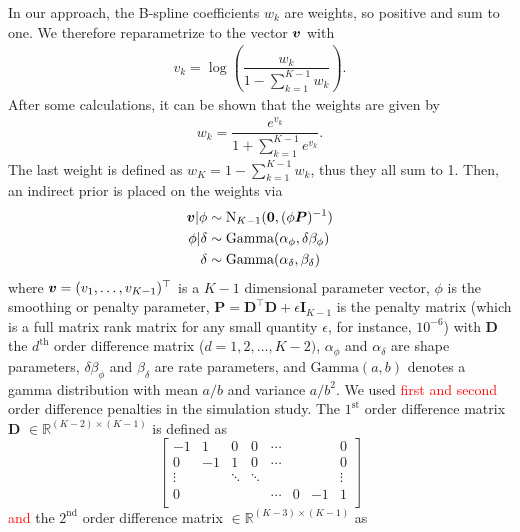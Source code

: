 \documentclass[twocolumn,final]{svjour3}
\newcommand{\bm}[1]{\mbox{\boldmath $#1$}}
\begin{document}
In our approach, the B-spline coefficients $w_k$ are weights, so positive and sum to one. 
We therefore reparametrize to the vector $\bm{v}$ with
\begin{align*}
v_k = \log \left( \dfrac{w_k}{1-\sum_{k=1}^{K-1}w_k} \right).
\end{align*}
After some calculations, it can be shown that the weights are given by
\begin{align*}
w_k = \dfrac{e^{v_k}}{1+ \sum^{K-1}_{k=1}e^{v_k}}.
\end{align*}
The last weight is defined as $w_K = 1 - \sum_{k=1}^{K-1}w_k$, thus they all sum to 1.
Then, an indirect prior is placed on the weights via
\begin{align*}
\bm{v}|\phi&\sim\text{N}_{K-1}(\bm{0}, (\phi \bm{P})^{-1})\\
\phi|\delta &\sim \text{Gamma}(\alpha_{\phi}, \delta \beta_{\phi})\\
\delta &\sim \text{Gamma}(\alpha_{\delta}, \beta_{\delta})
\end{align*}
where $\bm{v} = (v_1,\dots,v_{K-1})^\top$ is a $K-1$ dimensional parameter vector, $\phi$ is the smoothing or penalty parameter, $\textbf{P} = \textbf{D}^\top \textbf{D} +\epsilon \textbf{I}_{K-1}$ is the penalty matrix (which is a full matrix rank matrix for any small quantity $\epsilon$, for instance, $10^{-6}$) with $\textbf{D}$ the $d^{\text{th}}$ order difference matrix ($d=1,2,\ldots, K-2)$, $\alpha_{\phi}$ and $\alpha_{\delta}$ are shape parameters, $\delta \beta_{\phi}$ and $\beta_{\delta}$ are rate parameters, and $\text{Gamma}(a,b)$ denotes a gamma distribution with mean $a/b$ and variance $a/b^2$.
We used \textcolor{red}{first and second}  order difference penalties in the simulation study.
The $1^{\text{st}}$ order difference matrix \textbf{D} $\in \mathbb{R}^{(K-2)\times (K-1)}$  is defined as
\begin{equation}\label{eq:D1}
\begin{bmatrix}
-1 & 1   & 0  & 0 & \cdots & & & 0 \\
0  &  -1 & 1  & 0 & \cdots & & & 0 \\
\vdots  &    & \ddots & \ddots   & &&& \vdots \\   
0 &    &    &   & \cdots & 0 &  -1 & 1 \\
\end{bmatrix}
\end{equation}
\textcolor{red}{and} the $2^{\text{nd}}$ order difference matrix $\in \mathbb{R}^{(K-3)\times (K-1)} $ as
\end{document}
